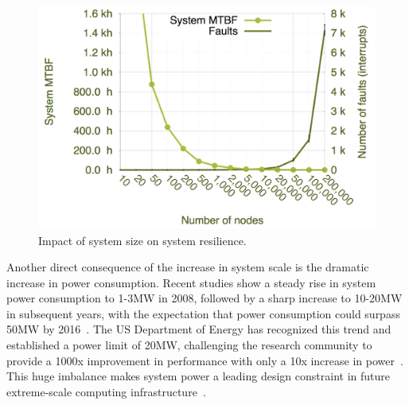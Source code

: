 \begin{figure}[!t]
	\begin{center}
		\includegraphics[width=0.9\columnwidth]{Figures/sandia_system_failure_rate_increase_nodes}
	\end{center}
	\caption{Impact of system size on system resilience.}
	\label{fig:exe_failure}
\end{figure}

Another direct consequence of the increase in system scale is the dramatic increase in power consumption. Recent studies show a steady rise in system power consumption to 1-3MW in 2008, followed by a sharp increase to 10-20MW in subsequent years, with the expectation that power consumption could surpass 50MW by 2016~\cite{doe_ascr_exascale_2011}. The US Department of Energy has recognized this trend and established a power limit of 20MW, challenging the research community to provide a 1000x improvement in performance with only a 10x increase in power~\cite{doe_ascr_exascale_2011}. %
This huge imbalance makes system power a leading design constraint in future extreme-scale computing infrastructure~\cite{Sarood2014,Villa2014}.


